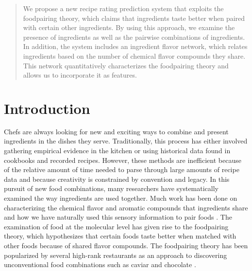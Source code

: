 \documentclass{article}
\begin{document}
 


\begin{abstract} 
We propose a new recipe rating prediction system that exploits the foodpairing theory, which claims that ingredients taste better when paired with certain other ingredients. By using this approach, we examine the presence of ingredients as well as the pairwise combinations of ingredients. In addition, the system includes an ingredient flavor network, which relates ingredients based on the number of chemical flavor compounds they share. This network quantitatively characterizes the foodpairing theory and allows us to incorporate it as features.
\end{abstract} 

\section{Introduction}
Chefs are always looking for new and exciting ways to combine and present ingredients in the dishes they serve. Traditionally, this process has either involved gathering empirical evidence in the kitchen or using historical data found in cookbooks and recorded recipes. However, these methods are inefficient because of the relative amount of time needed to parse through large amounts of recipe data and because creativity is constrained by convention and legacy. In this pursuit of new food combinations, many researchers have systematically examined the way ingredients are used together. Much work has been done on characterizing the chemical flavor and aromatic compounds that ingredients share and how we have naturally used this sensory information to pair foods \cite{leffingwell00,burdock09}. The examination of food at the molecular level has given rise to the foodpairing theory, which hypothesizes that certain foods taste better when matched with other foods because of shared flavor compounds. The foodpairing theory has been popularized by several high-rank restaurants as an approach to discovering unconventional food combinations such as caviar and chocolate \cite{blumenthal02}.
\end{document}
